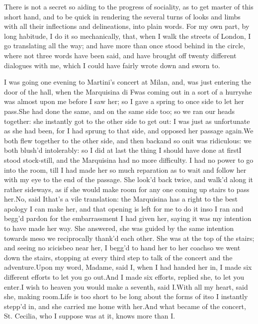 \documentclass[twoside]{article}
\begin{document}
There is not a secret so aiding to the progress of sociality, as to get
master of this \i{short hand}, and to be quick in rendering the several
turns of looks and limbs with all their inflections and delineations,
into plain words.  For my own part, by long habitude, I do it so
mechanically, that, when I walk the streets of London, I go translating
all the way; and have more than once stood behind in the circle, where
not three words have been said, and have brought off twenty different
dialogues with me, which I could have fairly wrote down and sworn to.

I was going one evening to Martini’s concert at Milan, and, was just
entering the door of the hall, when the Marquisina di F\tsk  was coming out
in a sort of a hurry\tsk she was almost upon me before I saw her; so I gave
a spring to once side to let her pass.\tsk She had done the same, and on the
same side too; so we ran our heads together: she instantly got to the
other side to get out: I was just as unfortunate as she had been, for I
had sprung to that side, and opposed her passage again.\tsk We both flew
together to the other side, and then back\tsk and so on\tsk it was ridiculous:
we both blush’d intolerably: so I did at last the thing I should have
done at first\tsk I stood stock-still, and the Marquisina had no more
difficulty.  I had no power to go into the room, till I had made her so
much reparation as to wait and follow her with my eye to the end of the
passage.  She look’d back twice, and walk’d along it rather sideways, as
if she would make room for any one coming up stairs to pass her.\tsk No, said
I\tsk that’s a vile translation: the Marquisina has a right to the best
apology I can make her, and that opening is left for me to do it in\tsk so I
ran and begg’d pardon for the embarrassment I had given her, saying it
was my intention to have made her way.  She answered, she was guided by
the same intention towards me\tsk so we reciprocally thank’d each other.
She was at the top of the stairs; and seeing no \i{cicisbeo} near her, I
begg’d to hand her to her coach\tsk so we went down the stairs, stopping at
every third step to talk of the concert and the adventure.\tsk Upon my word,
Madame, said I, when I had handed her in, I made six different efforts to
let you go out.\tsk And I made six efforts, replied she, to let you enter.\tsk I
wish to heaven you would make a seventh, said I.\tsk With all my heart, said
she, making room.\tsk Life is too short to be long about the forms of it\tsk so
I instantly stepp’d in, and she carried me home with her.\tsk And what became
of the concert, St. Cecilia, who I suppose was at it, knows more than I.
\end{document}
